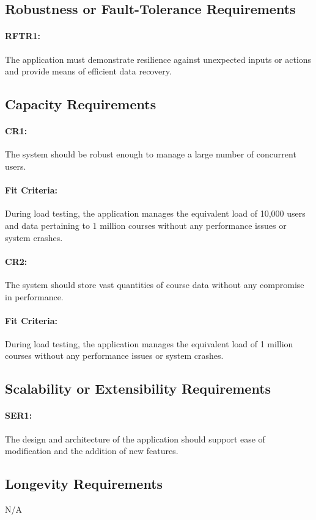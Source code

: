 \documentclass[12pt]{article}
\begin{document}
\subsection{Robustness or Fault-Tolerance Requirements}
\paragraph{RFTR1:} The application must demonstrate resilience against unexpected inputs or actions and provide means of efficient data recovery.


\subsection{Capacity Requirements}
\paragraph{CR1:} The system should be robust enough to manage a large number of concurrent users.
\paragraph{Fit Criteria:} During load testing, the application manages the equivalent load of 10,000 users and data pertaining to 1 million courses without any performance issues or system crashes.
\paragraph{CR2:}The system should store vast quantities of course data without any compromise in performance.
\paragraph{Fit Criteria:} During load testing, the application manages the equivalent load of 1 million courses without any performance issues or system crashes.
\subsection{Scalability or Extensibility Requirements}
\paragraph{SER1:} The design and architecture of the application should support ease of modification and the addition of new features.
\subsection{Longevity Requirements}
N/A
\end{document}
